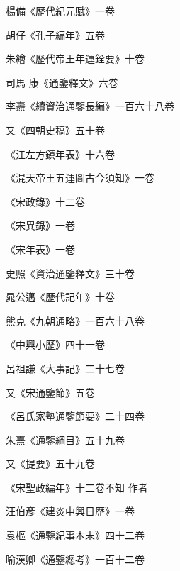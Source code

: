 \begin{pinyinscope}
 楊備《歷代紀元賦》一卷



 胡仔《孔子編年》五卷



 朱繪《歷代帝王年運銓要》十卷



 司馬
 康《通鑒釋文》六卷



 李燾《續資治通鑒長編》一百六十八卷



 又《四朝史稿》五十卷



 《江左方鎮年表》十六卷



 《混天帝王五運圖古今須知》一卷



 《宋政錄》十二卷



 《宋異錄》一卷



 《宋年表》一卷



 史照《資治通鑒釋文》三十卷



 晁公邁《歷代記年》十卷



 熊克《九朝通略》一百六十八卷



 《中興小歷》四十一卷



 呂祖謙《大事記》二十七卷



 又《宋通鑒節》五卷



 《呂氏家塾通鑒節要》二十四卷



 朱熹《通鑒綱目》五十九卷



 又《提要》五十九卷



 《宋聖政編年》十二卷不知
 作者



 汪伯彥《建炎中興日歷》一卷



 袁樞《通鑒紀事本末》四十二卷



 喻漢卿《通鑒總考》一百十二卷




\end{pinyinscope}

